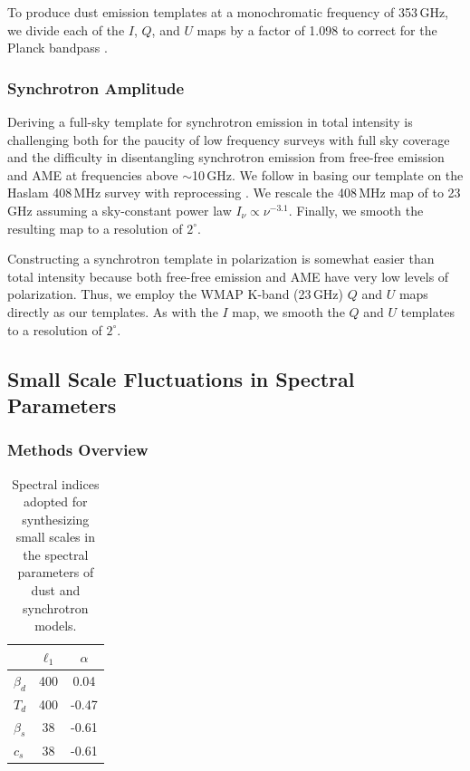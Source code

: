 \documentclass[twocolumn]{aastex631}
\begin{document}
To produce dust emission templates at a monochromatic frequency of 353\,GHz, we divide each of the $I$, $Q$, and $U$ maps by a factor of 1.098 to correct for the Planck bandpass \citep[][Table~2]{planck2016-l11A}.

\subsubsection{Synchrotron Amplitude}
Deriving a full-sky template for synchrotron emission in total intensity is challenging both for the paucity of low frequency surveys with full sky coverage and the difficulty in disentangling synchrotron emission from free-free emission and AME at frequencies above $\sim$10\,GHz. We follow \citet{Thorne:2017} in basing our template on the Haslam 408\,MHz survey with reprocessing \citep{Remazeilles:2015}. We rescale the 408\,MHz map of \cite{Remazeilles:2015} to 23\,GHz assuming a sky-constant power law $I_\nu \propto \nu^{-3.1}$. Finally, we smooth the resulting map to a resolution of $2^\circ$.

Constructing a synchrotron template in polarization is somewhat easier than total intensity because both free-free emission and AME have very low levels of polarization. Thus, we employ the WMAP K-band (23\,GHz) $Q$ and $U$ maps directly as our templates. As with the $I$ map, we smooth the $Q$ and $U$ templates to a resolution of $2^\circ$.


\subsection{Small Scale Fluctuations in Spectral Parameters}

\subsubsection{Methods Overview}
\begin{table}
    \centering
    \begin{tabular}{lcc}
    \toprule 
   &   $ \ell_1   $    &$\alpha$  \\
   \midrule  
   $\beta_d$ & 400 & 0.04 \\ 
   $T_d$  &  400  & -0.47\\
    \midrule 
    $\beta_s$ & 38 & -0.61\\
    $c_s$ & 38 &  -0.61  \\ 
   \bottomrule
    \end{tabular}
    \caption{Spectral indices adopted for synthesizing  small scales in the spectral parameters of dust and synchrotron models. }
    \label{tab:smallscale_specpar}
\end{table}
\end{document}
